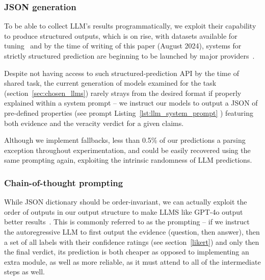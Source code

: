 \subsubsection{JSON generation}

To be able to collect LLM's results programmatically, we exploit their capability to produce structured outputs, which is on  rise, with datasets available for tuning~\cite{tang2024strucbenchlargelanguagemodels} and by the time of writing of this paper (August 2024), systems for strictly structured prediction are beginning to be launched by major providers~\cite{json}.

Despite not having access to such structured-prediction API by the time of \averitec{} shared task, the current generation of models examined for the task (section~\ref{sec:chosen_llms}) rarely strays from the desired format if properly explained within a system prompt -- we instruct our models to output a JSON of pre-defined properties (see prompt Listing~\ref{lst:llm_system_prompt} ) featuring both evidence and the veracity verdict for a given claims.

Although we implement fallbacks, less than 0.5\% of our predictions  a parsing exception throughout experimentation, and could be easily recovered using the same prompting again, exploiting the intrinsic randomness of LLM predictions.

\subsubsection{Chain-of-thought prompting}
While JSON dictionary should be order-invariant, we can actually exploit the order of outputs in our output structure to make LLMS like GPT-4o output better results~\cite{cot}.
This is commonly referred to as the  prompting -- if we instruct the autoregressive LLM to first output the evidence (question, then answer), then a set of all labels with their confidence ratings (see section~\ref{likert}) and only then the final verdict, its prediction is both cheaper as opposed to implementing an extra module, as well as more reliable, as it must attend to all of the intermediate steps as well.

